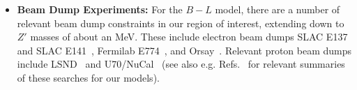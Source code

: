 \documentclass[11pt]{article}
\begin{document}
\begin{itemize}
\item \textbf{Beam Dump Experiments:} For the $B-L$ model, there are a number of relevant beam dump constraints in our region of interest, extending down to $Z'$ masses of about an MeV. These include electron beam dumps SLAC E137 and SLAC E141~\cite{PhysRevLett59755, PhysRevD383375, Bjorken:2009mm, Andreas:2012mt},  Fermilab E774~\cite{PhysRevLett672942}, and Orsay~\cite{Davier:1989wz}.
Relevant proton beam dumps include LSND~\cite{Athanassopoulos:1997er} and U70/NuCal~\cite{Blumlein:2011mv,Blumlein:2013cua} (see also e.g. Refs.~\cite{Ilten:2018crw,Bauer:2018onh, Foldenauer:2018zrz} for relevant summaries of these searches for our models).


\end{itemize}
\end{document}
